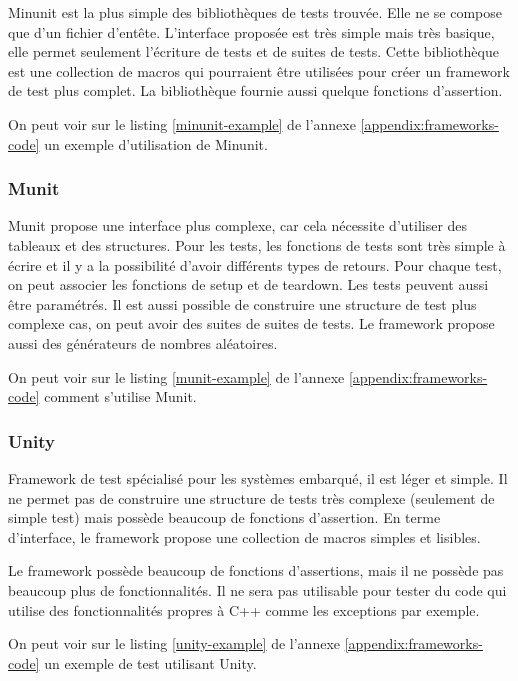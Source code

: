 \documentclass[a4paper]{article}
\begin{document}
Minunit est la plus simple des bibliothèques de tests trouvée. Elle ne se
compose que d'un fichier d'entête. L'interface proposée est très simple mais
très basique, elle permet seulement l'écriture de tests et de suites de tests.
Cette bibliothèque est une collection de macros qui pourraient être utilisées
pour créer un framework de test plus complet. La bibliothèque fournie aussi
quelque fonctions d'assertion.

On peut voir sur le listing \ref{minunit-example} de l'annexe
\ref{appendix:frameworks-code} un exemple d'utilisation de Minunit.

\subsubsection*{Munit}

Munit propose une interface plus complexe, car cela nécessite d'utiliser des
tableaux et des structures. Pour les tests, les fonctions de tests sont très
simple à écrire et il y a la possibilité d'avoir différents types de retours.
Pour chaque test, on peut associer les fonctions de setup et de teardown. Les
tests peuvent aussi être paramétrés. Il est aussi possible de construire une
structure de test plus complexe cas, on peut avoir des suites de suites de tests.
Le framework propose aussi des générateurs de nombres aléatoires.

On peut voir sur le listing \ref{munit-example} de l'annexe
\ref{appendix:frameworks-code} comment s'utilise Munit.

\subsubsection*{Unity}

Framework de test spécialisé pour les systèmes embarqué, il est léger et simple.
Il ne permet pas de construire une structure de tests très complexe (seulement
de simple test) mais possède beaucoup de fonctions d'assertion. En terme
d'interface, le framework propose une collection de macros simples et lisibles.

Le framework possède beaucoup de fonctions d'assertions, mais il ne possède pas
beaucoup plus de fonctionnalités. Il ne sera pas utilisable pour tester du code
qui utilise des fonctionnalités propres à C++ comme les exceptions par exemple.

On peut voir sur le listing \ref{unity-example} de l'annexe
\ref{appendix:frameworks-code} un exemple de test utilisant Unity.
\end{document}
